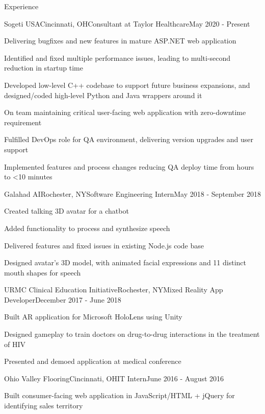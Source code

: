 \documentclass{resume} %
\begin{document}
\begin{rSection}{Experience}

\begin{rSubsection}{Sogeti USA}{Cincinnati, OH}{Consultant at Taylor Healthcare}{May 2020 - Present}
\item Delivering bugfixes and new features in mature ASP.NET web application
\item Identified and fixed multiple performance issues, leading to multi-second reduction in startup time
\item Developed low-level C++ codebase to support future business expansions, and designed/coded high-level Python and Java wrappers around it
\item On team maintaining critical user-facing web application with zero-downtime requirement
\item Fulfilled DevOps role for QA environment, delivering version upgrades and user support
\item Implemented features and process changes reducing QA deploy time from hours to <10 minutes
\end{rSubsection}


\begin{rSubsection}{Galahad AI}{Rochester, NY}{Software Engineering Intern}{May 2018 - September 2018}
\item Created talking 3D avatar for a chatbot
\item Added functionality to process and synthesize speech
\item Delivered features and fixed issues in existing Node.js code base
\item Designed avatar’s 3D model, with animated facial expressions and 11 distinct mouth shapes for speech
\end{rSubsection}


\begin{rSubsection}{URMC Clinical Education Initiative}{Rochester, NY}{Mixed Reality App Developer}{December 2017 - June 2018}
\item Built AR application for Microsoft HoloLens using Unity
\item Designed gameplay to train doctors on drug-to-drug interactions in the treatment of HIV
\item Presented and demoed application at medical conference
\end{rSubsection}


\begin{rSubsection}{Ohio Valley Flooring}{Cincinnati, OH}{IT Intern}{June 2016 - August 2016}
\item Built consumer-facing web application in JavaScript/HTML + jQuery for identifying sales territory
\end{rSubsection}

\end{rSection}
\end{document}
